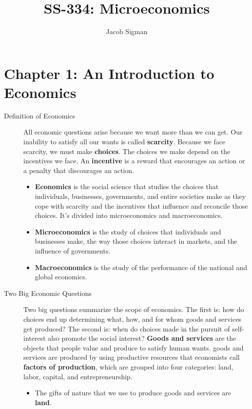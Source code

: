\documentclass{article}
\title{SS-334: Microeconomics}
\author{Jacob Sigman}
\date{}
\begin{document}
\maketitle
\tableofcontents
\newpage
\section*{Chapter 1: An Introduction to Economics}
\begin{description}
    \item [Definition of Economics] All economic questions arise because we want more than we can get. Our inability to satisfy all our wants is called \textbf{scarcity}. Because we face scarcity, we must make \textbf{choices}. The choices we make depend on the incentives we face. An \textbf{incentive} is a reward that encourages an action or a penalty that discourages an action.
    \begin{itemize}
        \item \textbf{Economics} is the social science that studies the choices that individuals, businesses, governments, and entire societies make as they cope with scarcity and the incentives that influence and reconcile those choices. It's divided into microeconomics and macroeconomics.
        \item \textbf{Microeconomics} is the study of choices that individuals and businesses make, the way those choices interact in markets, and the influence of governments.
        \item \textbf{Macroeconomics} is the study of the performance of the national and global economics.
    \end{itemize}
    \item [Two Big Economic Questions] Two big questions summarize the scope of economics. The first is: how do choices end up determining what, how, and for whom goods and services get produced? The second is: when do choices made in the pursuit of self-interest also promote the social interest? \textbf{Goods and services} are the objects that people value and produce to satisfy human wants. goods and services are produced by using productive resources that economists call \textbf{factors of production}, which are grouped into four categories: land, labor, capital, and entrepreneurship.
    \begin{itemize}
        \item The gifts of nature that we use to produce goods and services are \textbf{land}.

\end{itemize}
\end{description}
\end{document}
